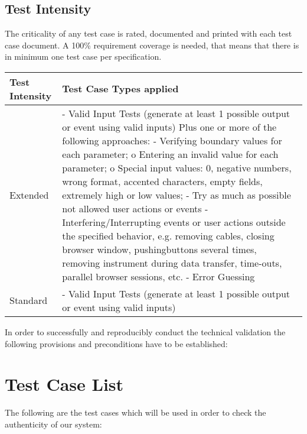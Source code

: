 \documentclass{article}
\begin{document}
\subsection{Test Intensity}
The criticality of any test case is rated, documented and printed with each test case document.
A 100\% requirement coverage is needed, that means that there is in minimum one test case per specification.
\begin{flushleft}
    \begin{tabular}{|p{3cm}|p{11cm}|}
        \hline
	    Test Intensity &Test Case Types applied\\
        \hline
			Extended &  {-	Valid Input Tests (generate at least 1 possible output or event using valid inputs) \newline
Plus one or more of the following approaches:\newline
-	Verifying boundary values for each parameter;\newline
o	Entering an invalid value for each parameter;\newline
o	Special input values: 0, negative numbers, wrong format, accented characters, empty fields, extremely high or low values;\newline
-	Try as much as possible not allowed user actions or events\newline
-	Interfering/Interrupting events or user actions outside the specified behavior, e.g. removing cables, closing browser window, pushing\newline buttons several times, removing instrument during data transfer, time-outs, parallel browser sessions, etc.\newline
-	Error Guessing\newline
}\\
			\hline
Standard	& -	Valid Input Tests (generate at least 1 possible output or event using valid inputs)\\
        \hline
	    
        
    \end{tabular}
\end{flushleft}

In order to successfully and reproducibly conduct the technical validation the following provisions and preconditions have to be established:

\section{Test Case List}
The following are  the test cases which will be used in order to check the authenticity of our system:
\end{document}
